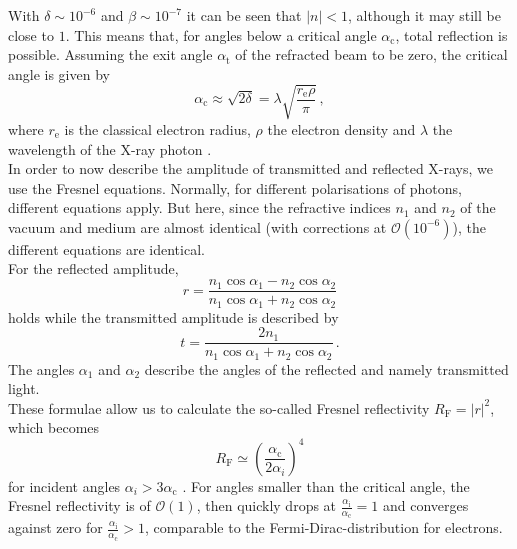 With $\delta \sim 10^{-6}$ and $\beta \sim 10^{-7}$ it can be seen that $|n| < 1$, although it may still be close to $1$.
This means that, for angles below a critical angle $\alpha_\text{c}$, total reflection is possible.
Assuming the exit angle $\alpha_\text{t}$ of the refracted beam to be zero, the critical angle is given by
\begin{equation}
    \alpha_\text{c} \approx \sqrt{2\delta} = \lambda \sqrt{\frac{r_\text{e} \rho}{\pi}} \,,
    \label{eq:critangle}
\end{equation} 
where $r_\text{e}$ is the classical electron radius, $\rho$ the electron density and $\lambda$ the wavelength of the X-ray photon \cite{tolan}. \\

In order to now describe the amplitude of transmitted and reflected X-rays, we use the Fresnel equations.
Normally, for different polarisations of photons, different equations apply.
But here, since the refractive indices $n_1$ and $n_2$ of the vacuum and medium are almost identical (with corrections at $\mathcal{O}(10^{-6})$),
the different equations are identical. \\
For the reflected amplitude,
\begin{equation}
    r = \frac{n_1 \cos \alpha_1 - n_2 \cos\alpha_2}{n_1 \cos \alpha_1 + n_2 \cos\alpha_2}
    \label{eq:reflectedamplitude}
\end{equation}
holds while the transmitted amplitude is described by
\begin{equation}
    t = \frac{2 n_1}{n_1 \cos \alpha_1 + n_2 \cos\alpha_2} \,.
    \label{eq:transmittedamplitude}
\end{equation}
The angles $\alpha_1$ and $\alpha_2$ describe the angles of the reflected and namely transmitted light. \\

These formulae allow us to calculate the so-called Fresnel reflectivity $R_\text{F} = |r|^2$, which becomes
\begin{equation}
    R_\text{F} \simeq \left(\frac{\alpha_\text{c}}{2\alpha_i}\right)^4
    \label{eq:fresnelreflectivity}
\end{equation}
for incident angles $\alpha_i > 3 \alpha_\text{c}$ \cite{tolan}.
For angles smaller than the critical angle, the Fresnel reflectivity is of $\mathcal{O}(1)$, then quickly drops at $\frac{\alpha_\text{i}}{\alpha_\text{c}} = 1$
and converges against zero for $\frac{\alpha_\text{i}}{\alpha_\text{c}} > 1$, comparable to the Fermi-Dirac-distribution for electrons.


